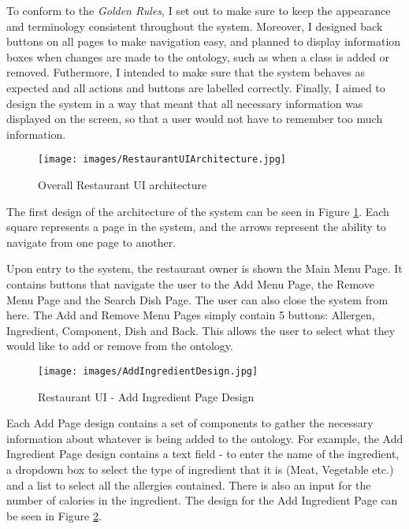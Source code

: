 To conform to the \textit{Golden Rules}, I set out to make sure to keep the appearance and terminology consistent throughout the system. Moreover, I designed back buttons on all pages to make navigation easy, and planned to display information boxes when changes are made to the ontology, such as when a class is added or removed. Futhermore, I intended to make sure that the system behaves as expected and all actions and buttons are labelled correctly. Finally, I aimed to design the system in a way that meant that all necessary information was displayed on the screen, so that a user would not have to remember too much information.

\begin{figure}[h]
    \centering
    \captionsetup{justification=centering}
    \texttt{[image: images/RestaurantUIArchitecture.jpg]}
    \caption{Overall Restaurant UI architecture}
    \label{fig:restaurantUI_architecture}
\end{figure}

The first design of the architecture of the system can be seen in Figure \ref{fig:restaurantUI_architecture}. Each square represents a page in the system, and the arrows represent the ability to navigate from one page to another.

Upon entry to the system, the restaurant owner is shown the Main Menu Page. It contains buttons that navigate the user to the Add Menu Page, the Remove Menu Page and the Search Dish Page. The user can also close the system from here. The Add and Remove Menu Pages simply contain 5 buttons: Allergen, Ingredient, Component, Dish and Back. This allows the user to select what they would like to add or remove from the ontology.

\begin{figure}[h]
    \centering
    \captionsetup{justification=centering}
    \texttt{[image: images/AddIngredientDesign.jpg]}
    \caption{Restaurant UI - Add Ingredient Page Design}
    \label{fig:restaurantUI_add_page_design}
\end{figure}

Each Add Page design contains a set of components to gather the necessary information about whatever is being added to the ontology. For example, the Add Ingredient Page design contains a text field - to enter the name of the ingredient, a dropdown box to select the type of ingredient that it is (Meat, Vegetable etc.) and a list to select all the allergies contained. There is also an input for the number of calories in the ingredient. The design for the Add Ingredient Page can be seen in Figure \ref{fig:restaurantUI_add_page_design}.

